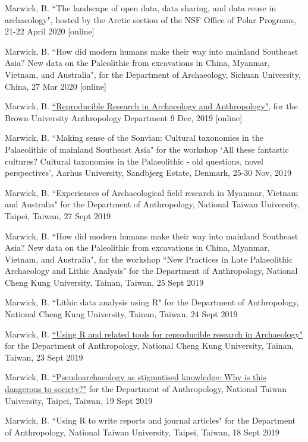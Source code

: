 \ind Marwick, B. ``The landscape of open data, data sharing, and data reuse in archaeology", hosted by the Arctic section of the NSF Office of Polar Programs, 21-22 April 2020 [online]

\ind Marwick, B. ``How did modern humans make their way into mainland Southeast Asia? New data on the Paleolithic from excavations in China, Myanmar, Vietnam, and Australia", for the Department of Archaeology, Sichuan University, China, 27 Mar 2020 [online]

\ind Marwick, B. \href{https://benmarwick.github.io/2019-12-09-brown/}{``Reproducible Research in Archaeology and Anthropology"}, for the Brown University Anthropology Department 9 Dec, 2019 [online]

\ind Marwick, B. ``Making sense of the Sonvian: Cultural taxonomies in the Palaeolithic of mainland Southeast Asia" for the workshop ‘All these fantastic cultures? Cultural taxonomies in the Palaeolithic - old questions, novel perspectives’, Aarhus University, Sandbjerg Estate, Denmark, 25-30 Nov, 2019 

\ind Marwick, B. ``Experiences of Archaeological field research in Myanmar, Vietnam and Australia" for the Department of Anthropology, National Taiwan University, Taipei, Taiwan, 27 Sept 2019

\ind Marwick, B.  ``How did modern humans make their way into mainland Southeast Asia? New data on the Paleolithic from excavations in China, Myanmar, Vietnam, and Australia", for the workshop ``New Practices in Late Palaeolithic Archaeology and Lithic Analysis" for the Department of Anthropology, National Cheng Kung University, Tainan, Taiwan, 25 Sept 2019 

\ind Marwick, B. ``Lithic data analysis using R" for the Department of Anthropology, National Cheng Kung University, Tainan, Taiwan, 24 Sept 2019 

\ind Marwick, B. \href{https://osf.io/e3x7u/}{``Using R and related tools for reproducible research in Archaeology"} for the Department of Anthropology, National Cheng Kung University, Tainan, Taiwan, 23 Sept 2019 

\ind Marwick, B. \href{https://osf.io/ktrns/}{``Pseudoarchaeology as stigmatised knowledge: Why is this dangerous to society?"} for the Department of Anthropology, National Taiwan University, Taipei, Taiwan, 19 Sept 2019 

\ind Marwick, B. ``Using R to write reports and journal articles" for the Department of Anthropology, National Taiwan University, Taipei, Taiwan, 18 Sept 2019

